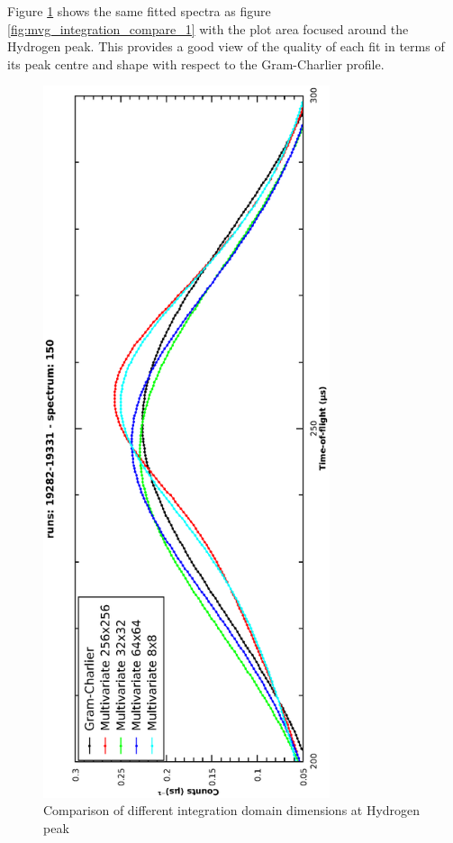 \documentclass[a4paper]{article}
\begin{document}
Figure \ref{fig:mvg_integration_compare_2} shows the same fitted spectra as
figure \ref{fig:mvg_integration_compare_1} with the plot area focused around the
Hydrogen peak. This provides a good view of the quality of each fit in terms of
its peak centre and shape with respect to the Gram-Charlier profile.

\begin{figure}[h!]
  \centering
  \begin{turn}{-90}
    \includegraphics[width=0.75\textwidth]{graphics/mvg_integration_compare_2.eps}
  \end{turn}
  \vspace{-80pt}
  \caption{Comparison of different integration domain dimensions at Hydrogen
           peak}
  \label{fig:mvg_integration_compare_2}
\end{figure}
\FloatBarrier
\end{document}
